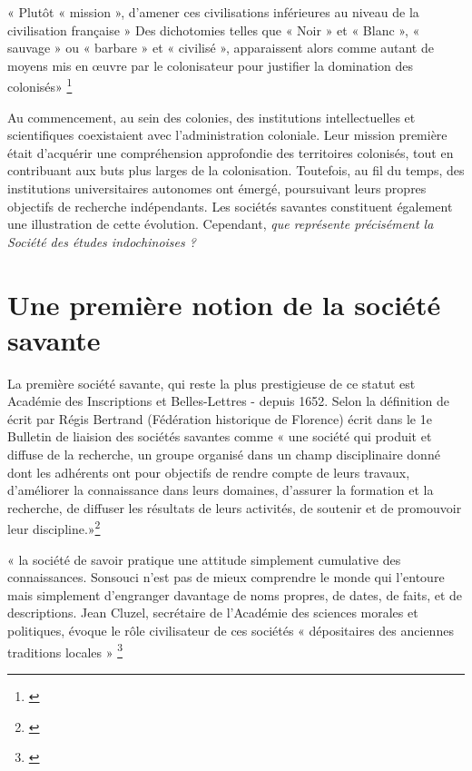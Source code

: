 « Plutôt « mission », d’amener ces civilisations inférieures au niveau de la civilisation française »
Des dichotomies telles que « Noir » et « Blanc », « sauvage » ou « barbare » et « civilisé », apparaissent alors comme autant de moyens mis en œuvre par le colonisateur pour justifier la domination des colonisés» \footnote{\cite{afri}}

Au commencement, au sein des colonies, des institutions intellectuelles et scientifiques coexistaient avec l'administration coloniale. Leur mission première était d'acquérir une compréhension approfondie des territoires colonisés, tout en contribuant aux buts plus larges de la colonisation. Toutefois, au fil du temps, des institutions universitaires autonomes ont émergé, poursuivant leurs propres objectifs de recherche indépendants. Les sociétés savantes constituent également une illustration de cette évolution. 
Cependant, \textit{que représente précisément la Société des études indochinoises ?}




\section{Une première notion de la société savante}

La première société savante, qui reste la plus prestigieuse de ce statut est Académie des Inscriptions et Belles-Lettres - depuis 1652. Selon la définition de écrit par Régis Bertrand (Fédération historique de Florence) écrit dans le 1e Bulletin de liaision des sociétés savantes comme « une société qui produit et diffuse de la recherche, un groupe organisé dans un champ disciplinaire donné dont les adhérents ont pour objectifs de rendre compte de leurs travaux, d'améliorer la connaissance dans leurs domaines, d'assurer la formation et la recherche, de diffuser les résultats de leurs activités, de soutenir et de promouvoir leur discipline.»{\footnote{\cite{bum}}}

« la société de savoir pratique une attitude simplement cumulative des connaissances. Sonsouci n'est pas de mieux comprendre le monde qui l'entoure mais simplement d'engranger davantage de noms propres, de dates, de faits, et de descriptions. Jean Cluzel, secrétaire de l'Académie des sciences morales et politiques, évoque le rôle civilisateur de ces sociétés « dépositaires des anciennes traditions locales » {\footnote{\cite{alkd}}}

